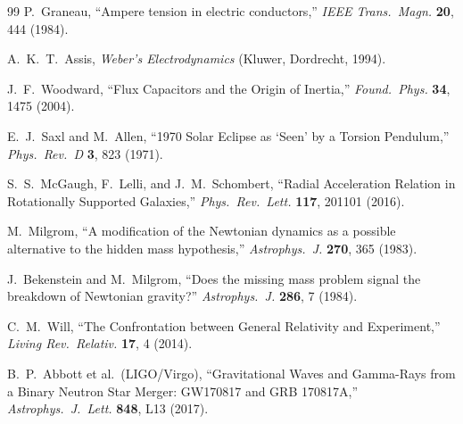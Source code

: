 \documentclass[aps,prd,twocolumn,superscriptaddress,floatfix,nofootinbib]{revtex4-2}
\begin{document}
\begin{thebibliography}{99}
P.~Graneau, ``Ampere tension in electric conductors,''
\textit{IEEE Trans.\ Magn.} \textbf{20}, 444 (1984).

A.~K.~T.~Assis, \textit{Weber's Electrodynamics} (Kluwer, Dordrecht, 1994).

J.~F.~Woodward, ``Flux Capacitors and the Origin of Inertia,''
\textit{Found.\ Phys.} \textbf{34}, 1475 (2004).

E.~J.~Saxl and M.~Allen, ``1970 Solar Eclipse as `Seen' by a Torsion Pendulum,''
\textit{Phys.\ Rev.\ D} \textbf{3}, 823 (1971).

S.~S.~McGaugh, F.~Lelli, and J.~M.~Schombert, ``Radial Acceleration Relation
in Rotationally Supported Galaxies,''
\textit{Phys.\ Rev.\ Lett.} \textbf{117}, 201101 (2016).

M.~Milgrom, ``A modification of the Newtonian dynamics as a possible
alternative to the hidden mass hypothesis,''
\textit{Astrophys.\ J.} \textbf{270}, 365 (1983).

J.~Bekenstein and M.~Milgrom, ``Does the missing mass problem signal
the breakdown of Newtonian gravity?''
\textit{Astrophys.\ J.} \textbf{286}, 7 (1984).

C.~M.~Will, ``The Confrontation between General Relativity and Experiment,''
\textit{Living Rev.\ Relativ.} \textbf{17}, 4 (2014).

B.~P.~Abbott et al.\ (LIGO/Virgo), ``Gravitational Waves and Gamma-Rays from a
Binary Neutron Star Merger: GW170817 and GRB 170817A,''
\textit{Astrophys.\ J.\ Lett.} \textbf{848}, L13 (2017).

\end{thebibliography}
\end{document}

